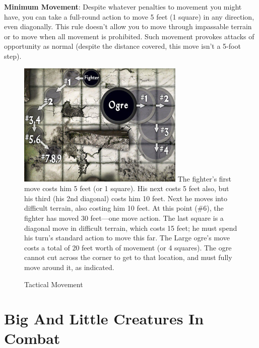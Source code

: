 \textbf{Minimum Movement}: Despite whatever penalties to movement you might have, you can take a full-round action to move 5 feet (1 square) in any direction, even diagonally. This rule doesn't allow you to move through impassable terrain or to move when all movement is prohibited. Such movement provokes attacks of opportunity as normal (despite the distance covered, this move isn't a 5-foot step).

\begin{figure}
 \sffamily
 \caption{Tactical Movement}
 \includegraphics[width=\linewidth]{images/TacticalMovement.jpg}
 The fighter's first move costs him 5 feet (or 1 square). His next costs 5 feet also, but his third (his 2nd diagonal) costs him 10 feet. Next he moves into difficult terrain, also costing him 10 feet. At this point (\#6), the fighter has moved 30 feet---one move action. The last square is a diagonal move in difficult terrain, which costs 15 feet; he must spend his turn's standard action to move this far.\newline
The Large ogre's move costs a total of 20 feet worth of movement (or 4 squares). The ogre cannot cut across the corner to get to that location, and must fully move around it, as indicated.
\end{figure}

\section{Big And Little Creatures In Combat}

